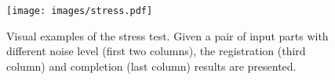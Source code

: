 \begin{figure}[!t]
  \centering
  \texttt{[image: images/stress.pdf]}
  \caption{Visual examples of the stress test. Given a pair of input parts with different noise level (first two columns),  the registration (third column) and completion (last column) results are presented.}
  \label{fig:stress}
\end{figure}
